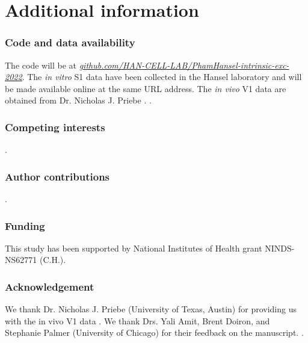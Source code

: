 \section{Additional information}

\subsubsection*{Code and data availability}

The code will be at
    \href{https://github.com/HAN-CELL-LAB/PhamHansel-intrinsic-exc-2022}{\textit{github.com/HAN-CELL-LAB/PhamHansel-intrinsic-exc-2022}}.
The \textit{in vitro} S1 data have been collected in the Hansel laboratory \citep{Gill2020-wy}
    and will be made available online at the same URL address.
The \textit{in vivo} V1 data are obtained from Dr. Nicholas J. Priebe \citep{Li2020-ej}.
.

\subsubsection*{Competing interests}

.

\subsubsection*{Author contributions}

.

\subsubsection*{Funding}

This study has been supported by National Institutes of Health grant NINDS-NS62771 (C.H.).

\subsubsection*{Acknowledgement}

We thank Dr. Nicholas J. Priebe (University of Texas, Austin)
    for providing us with the in vivo V1 data \citep{Li2020-ej}.
We thank Drs. Yali Amit, Brent Doiron, and Stephanie Palmer (University of Chicago)
    for their feedback on the manuscript.
.
